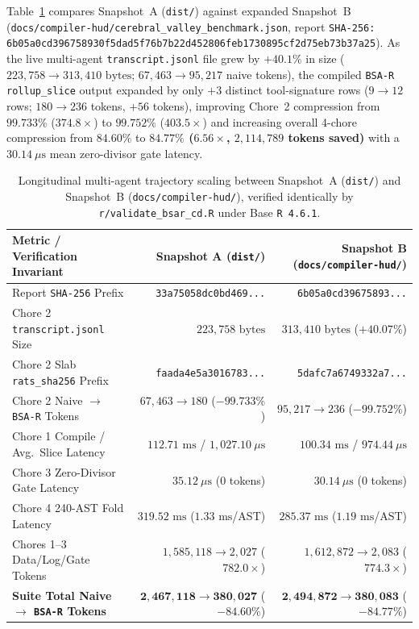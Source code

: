 \documentclass[11pt]{article}
\theoremstyle{plain}
\theoremstyle{definition}
\begin{document}
Table~\ref{tab:longitudinal} compares Snapshot~A (\texttt{dist/}) against expanded Snapshot~B (\texttt{docs/compiler-hud/cerebral\_valley\_benchmark.json}, report \texttt{SHA-256: 6b05a0cd396758930f5dad5f76b7b22d452806feb1730895cf2d75eb73b37a25}). As the live multi-agent \texttt{transcript.jsonl} file grew by $+40.1\%$ in size ($223{,}758 \to 313{,}410\text{ bytes}$; $67{,}463 \to 95{,}217$ naive tokens), the compiled \texttt{BSA-R} \texttt{rollup\_slice} output expanded by only $+3$ distinct tool-signature rows ($9 \to 12$ rows; $180 \to 236$ tokens, $+56$ tokens), improving Chore~2 compression from $99.733\%$ ($374.8\times$) to $99.752\%$ ($403.5\times$) and increasing overall 4-chore compression from $84.60\%$ to \textbf{$84.77\%$ ($6.56\times$, $2{,}114{,}789$ tokens saved)} with a $30.14~\mu\mathrm{s}$ mean zero-divisor gate latency.

\begin{table}[htbp]
\centering
\caption{Longitudinal multi-agent trajectory scaling between Snapshot~A (\texttt{dist/}) and Snapshot~B (\texttt{docs/compiler-hud/}), verified identically by \texttt{r/validate\_bsar\_cd.R} under Base \texttt{R 4.6.1}.}\label{tab:longitudinal}
\vspace{4pt}
\small
\begin{tabular}{@{}lrr@{}}
\toprule
Metric / Verification Invariant & Snapshot A (\texttt{dist/}) & Snapshot B (\texttt{docs/compiler-hud/}) \\
\midrule
Report \texttt{SHA-256} Prefix & \texttt{33a75058dc0bd469...} & \texttt{6b05a0cd39675893...} \\
Chore 2 \texttt{transcript.jsonl} Size & $223{,}758\text{ bytes}$ & $313{,}410\text{ bytes}$ ($+40.07\%$) \\
Chore 2 Slab \texttt{rats\_sha256} Prefix & \texttt{faada4e5a3016783...} & \texttt{5dafc7a6749332a7...} \\
Chore 2 Naive $\to$ \texttt{BSA-R} Tokens & $67{,}463 \to 180$ ($-99.733\%$) & $95{,}217 \to 236$ ($-99.752\%$) \\
Chore 1 Compile / Avg.\ Slice Latency & $112.71\text{ ms}$ / $1{,}027.10~\mu\text{s}$ & $100.34\text{ ms}$ / $974.44~\mu\text{s}$ \\
Chore 3 Zero-Divisor Gate Latency & $35.12~\mu\text{s}$ ($0$ tokens) & $30.14~\mu\text{s}$ ($0$ tokens) \\
Chore 4 240-AST Fold Latency & $319.52\text{ ms}$ ($1.33\text{ ms}$/AST) & $285.37\text{ ms}$ ($1.19\text{ ms}$/AST) \\
Chores 1--3 Data/Log/Gate Tokens & $1{,}585{,}118 \to 2{,}027$ ($782.0\times$) & $1{,}612{,}872 \to 2{,}083$ ($774.3\times$) \\
\textbf{Suite Total Naive $\to$ \texttt{BSA-R} Tokens} & $\mathbf{2{,}467{,}118 \to 380{,}027}$ ($\mathbf{-84.60\%}$) & $\mathbf{2{,}494{,}872 \to 380{,}083}$ ($\mathbf{-84.77\%}$) \\
\bottomrule
\end{tabular}
\end{table}
\end{document}
